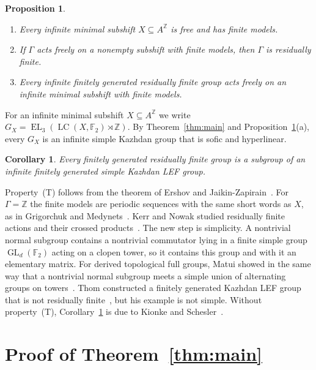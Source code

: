 \documentclass[11pt]{amsart}
\newtheorem{proposition}[theorem]{Proposition}
\newtheorem{corollary}[theorem]{Corollary}
\newcommand{\F}{\mathbb F}
\newcommand{\Z}{\mathbb Z}
\newcommand{\LC}{\operatorname{LC}}
\newcommand{\EL}{\operatorname{EL}}
\newcommand{\GL}{\operatorname{GL}}
\begin{document}
\begin{proposition}\label{prop:models}
\begin{enumerate}
\item[\textup{(a)}] Every infinite minimal subshift $X\subseteq A^{\Z}$ is
free and has finite models.
\item[\textup{(b)}] If $\Gamma$ acts freely on a nonempty subshift with
finite models, then $\Gamma$ is residually finite.
\item[\textup{(c)}] Every infinite finitely generated residually finite
group acts freely on an infinite minimal subshift with finite models.
\end{enumerate}
\end{proposition}

For an infinite minimal subshift $X\subseteq A^\Z$ we write
$G_X=\EL_3(\LC(X,\F_2)\rtimes\Z)$. By Theorem~\ref{thm:main} and
Proposition~\ref{prop:models}(a), every $G_X$ is an infinite simple
Kazhdan group that is sofic and hyperlinear.

\begin{corollary}\label{cor:rf}
Every finitely generated residually finite group is a subgroup of an
infinite finitely generated simple Kazhdan LEF group.
\end{corollary}

Property~\textup{(T)} follows from the theorem of Ershov and
Jaikin-Zapirain~\cite{EJZ}. For $\Gamma=\Z$ the finite models are
periodic sequences with the same short words as $X$, as in Grigorchuk
and Medynets~\cite{GM}. Kerr and Nowak studied residually finite actions
and their crossed products~\cite{KerrNowak}. The new step is simplicity.
A nontrivial normal subgroup contains a nontrivial commutator lying in a
finite simple group $\GL_d(\F_2)$ acting on a clopen tower, so it
contains this group and with it an elementary matrix. For derived
topological full groups, Matui showed in the same way that a nontrivial
normal subgroup meets a simple union of alternating groups on
towers~\cite[Lemma~3.4 and Theorem~4.9]{Matui}. Thom constructed a
finitely generated Kazhdan LEF group that is not residually
finite~\cite{Thom}, but his example is not simple. Without
property~\textup{(T)}, Corollary~\ref{cor:rf} is due to Kionke and
Schesler~\cite[Theorem~1.2]{KionkeSchesler}.

\section{Proof of Theorem~\ref{thm:main}}
\end{document}
